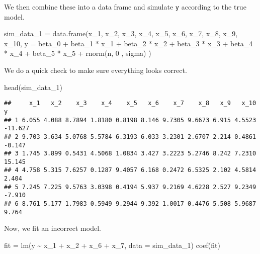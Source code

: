 \documentclass[
]{article}
\newenvironment{Shaded}{\begin{snugshade}}{\end{snugshade}}
\newcommand{\AttributeTok}[1]{\textcolor[rgb]{0.77,0.63,0.00}{#1}}
\newcommand{\DecValTok}[1]{\textcolor[rgb]{0.00,0.00,0.81}{#1}}
\newcommand{\FunctionTok}[1]{\textcolor[rgb]{0.00,0.00,0.00}{#1}}
\newcommand{\NormalTok}[1]{#1}
\newcommand{\OtherTok}[1]{\textcolor[rgb]{0.56,0.35,0.01}{#1}}
\newcommand{\SpecialCharTok}[1]{\textcolor[rgb]{0.00,0.00,0.00}{#1}}
\begin{document}
We then combine these into a data frame and simulate \texttt{y}
according to the true model.

\begin{Shaded}
\begin{Highlighting}[]
\NormalTok{sim\_data\_1 }\OtherTok{=} \FunctionTok{data.frame}\NormalTok{(x\_1, x\_2, x\_3, x\_4, x\_5, x\_6, x\_7, x\_8, x\_9, x\_10,}
  \AttributeTok{y =}\NormalTok{ beta\_0 }\SpecialCharTok{+}\NormalTok{ beta\_1 }\SpecialCharTok{*}\NormalTok{ x\_1 }\SpecialCharTok{+}\NormalTok{ beta\_2 }\SpecialCharTok{*}\NormalTok{ x\_2 }\SpecialCharTok{+}\NormalTok{ beta\_3 }\SpecialCharTok{*}\NormalTok{ x\_3 }\SpecialCharTok{+}\NormalTok{ beta\_4 }\SpecialCharTok{*}\NormalTok{ x\_4 }\SpecialCharTok{+} 
\NormalTok{      beta\_5 }\SpecialCharTok{*}\NormalTok{ x\_5 }\SpecialCharTok{+} \FunctionTok{rnorm}\NormalTok{(n, }\DecValTok{0}\NormalTok{ , sigma)}
\NormalTok{)}
\end{Highlighting}
\end{Shaded}

We do a quick check to make sure everything looks correct.

\begin{Shaded}
\begin{Highlighting}[]
\FunctionTok{head}\NormalTok{(sim\_data\_1)}
\end{Highlighting}
\end{Shaded}

\begin{verbatim}
##     x_1   x_2    x_3    x_4    x_5   x_6    x_7    x_8   x_9   x_10       y
## 1 6.055 4.088 8.7894 1.8180 0.8198 8.146 9.7305 9.6673 6.915 4.5523 -11.627
## 2 9.703 3.634 5.0768 5.5784 6.3193 6.033 3.2301 2.6707 2.214 0.4861  -0.147
## 3 1.745 3.899 0.5431 4.5068 1.0834 3.427 3.2223 5.2746 8.242 7.2310  15.145
## 4 4.758 5.315 7.6257 0.1287 9.4057 6.168 0.2472 6.5325 2.102 4.5814   2.404
## 5 7.245 7.225 9.5763 3.0398 0.4194 5.937 9.2169 4.6228 2.527 9.2349  -7.910
## 6 8.761 5.177 1.7983 0.5949 9.2944 9.392 1.0017 0.4476 5.508 5.9687   9.764
\end{verbatim}

Now, we fit an incorrect model.

\begin{Shaded}
\begin{Highlighting}[]
\NormalTok{fit }\OtherTok{=} \FunctionTok{lm}\NormalTok{(y }\SpecialCharTok{\textasciitilde{}}\NormalTok{ x\_1 }\SpecialCharTok{+}\NormalTok{ x\_2 }\SpecialCharTok{+}\NormalTok{ x\_6 }\SpecialCharTok{+}\NormalTok{ x\_7, }\AttributeTok{data =}\NormalTok{ sim\_data\_1)}
\FunctionTok{coef}\NormalTok{(fit)}
\end{Highlighting}
\end{Shaded}
\end{document}
